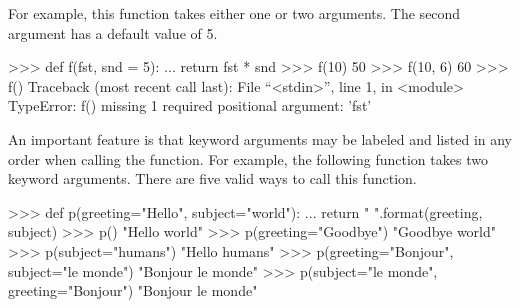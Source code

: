 \documentclass[11pt]{cselabheader}
\begin{document}
For example, this function takes either one or two arguments. The second
argument has a default value of 5.

\begin{pyconcode}
>>> def f(fst, snd = 5):
...    return fst * snd
>>> f(10)
50
>>> f(10, 6)
60
>>> f()
Traceback (most recent call last):
  File ``<stdin>'', line 1, in <module>
TypeError: f() missing 1 required positional argument: 'fst'
\end{pyconcode}

An important feature is that keyword arguments may be labeled
and listed in any order when calling the function. For example,
the following function takes two keyword arguments. There are five
valid ways to call this function.

\begin{pyconcode}
>>> def p(greeting="Hello", subject="world"):
...     return "{} {}".format(greeting, subject)
>>> p()
"Hello world"
>>> p(greeting="Goodbye")
"Goodbye world"
>>> p(subject="humans")
"Hello humans"
>>> p(greeting="Bonjour", subject="le monde")
"Bonjour le monde"
>>> p(subject="le monde", greeting="Bonjour")
"Bonjour le monde"
\end{pyconcode}
\end{document}
